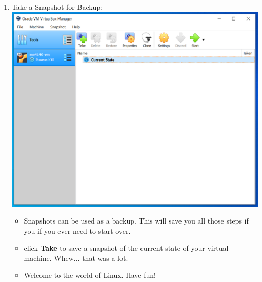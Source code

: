 \documentclass[12pt]{article}
\begin{document}
\begin{description}
\begin{description}
\begin{enumerate}[label=\alph*)]
    		\item Take a Snapshot for Backup: \vspace{5mm} \\
      		\includegraphics[scale=.50]{Capture27.png}
      		 \begin{itemize}
      		\item Snapshots can be used as a backup. This will save you all those steps if you if you ever need to start over.  
         
     		\item click {\bf Take} to save a snapshot of the current state of your virtual machine. Whew... that was a lot. 
     		\item Welcome to the world of Linux. Have fun!
    		\end{itemize}
\end{enumerate}

\end{description}    
\end{description}
\end{document}
